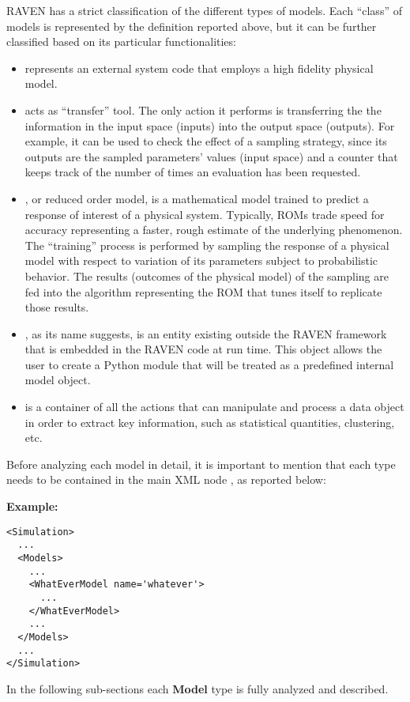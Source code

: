 RAVEN has a strict classification of the different types of models.
%
Each ``class'' of models is represented by the definition reported above, but it
can be further classified based on its particular functionalities:
\begin{itemize}
  \item {} represents an external system code that employs a high
  fidelity physical model.
  \item {} acts as ``transfer'' tool.
  The only action it performs is transferring the the information in the input
  space (inputs) into the output space (outputs).
  For example, it can be used to check the effect of a sampling strategy, since
  its outputs are the sampled parameters' values (input space) and a counter
  that keeps track of the number of times an evaluation has been requested.
  \item {}, or reduced order model, is a mathematical model trained
  to predict a response of interest of a physical system.
  Typically, ROMs trade speed for accuracy representing a faster, rough estimate
  of the underlying phenomenon.
  The ``training'' process is performed by sampling the response of a physical
  model with respect to variation of its parameters subject to probabilistic
  behavior.
  The results (outcomes of the physical model) of the sampling are fed into
  the algorithm representing the ROM that tunes itself to replicate those
  results.
  \item {}, as its name suggests, is an entity existing 
  outside the RAVEN framework that is embedded in the RAVEN code at run time.
  This object allows the user to create a Python module that will be treated as
  a predefined internal model object.
  \item {} is a container of all the actions that can
  manipulate and process a data object in order to extract key information,
  such as statistical quantities, clustering, etc.
\end{itemize}
Before analyzing each model in detail, it is important to mention that each
type needs to be contained in the main XML node , as reported
below:

\textbf{Example:}
\begin{lstlisting}[style=XML]
<Simulation>
  ...
  <Models>
    ...
    <WhatEverModel name='whatever'>
      ...
    </WhatEverModel>
    ...
  </Models>
  ...
</Simulation>
\end{lstlisting}
In the following sub-sections each \textbf{Model} type is fully analyzed and
described.
%

